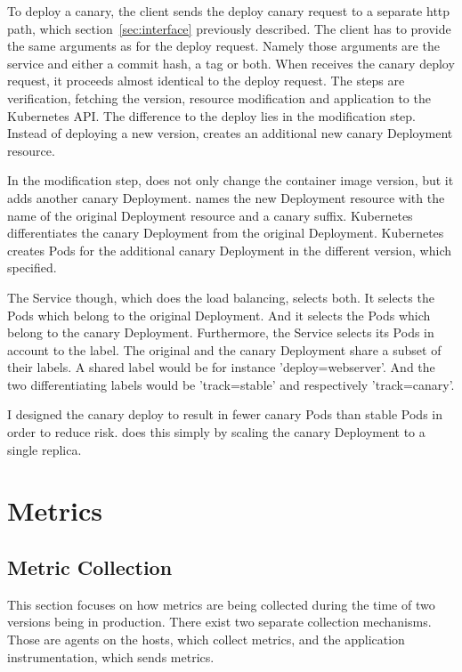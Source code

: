 To deploy a canary, the client sends the deploy canary request to a separate \gls{http} path,
which section~\ref{sec:interface} previously described. The client has to provide the
same arguments as for the deploy request. Namely those arguments are the service and
either a commit hash, a tag or both. When \deployer{} receives the canary deploy request, it
proceeds almost identical to the deploy request. The steps are verification, fetching the
version, resource modification and application to the Kubernetes API. The difference to
the deploy lies in the modification step. Instead of deploying a new version, \deployer{}
creates an additional new canary Deployment resource.

In the modification step, \deployer{} does not only change the container image version, but
it adds another canary Deployment. \deployer{} names the new Deployment resource with the
name of the original Deployment resource and a canary suffix. Kubernetes differentiates
the canary Deployment from the original Deployment. Kubernetes creates Pods for the
additional canary Deployment in the different version, which \deployer{} specified.

The Service though, which does the load balancing, selects both. It selects the Pods which
belong to the original Deployment. And it selects the Pods which belong to the canary
Deployment. Furthermore, the Service selects its Pods in account to the label. The original and
the canary Deployment share a subset of their labels. A shared label would be for instance
'deploy=webserver'. And the two differentiating labels would be 'track=stable' and
respectively 'track=canary'.

I designed the canary deploy to result in fewer canary Pods than stable Pods in order to
reduce risk. \deployer{} does this simply by scaling the
canary Deployment to a single replica.

\section{Metrics}

\subsection{Metric Collection}

This section focuses on how metrics are being collected during the time of two versions being in
production. There exist two separate collection mechanisms. Those are agents on the hosts, which collect
metrics, and the application instrumentation, which sends metrics.

